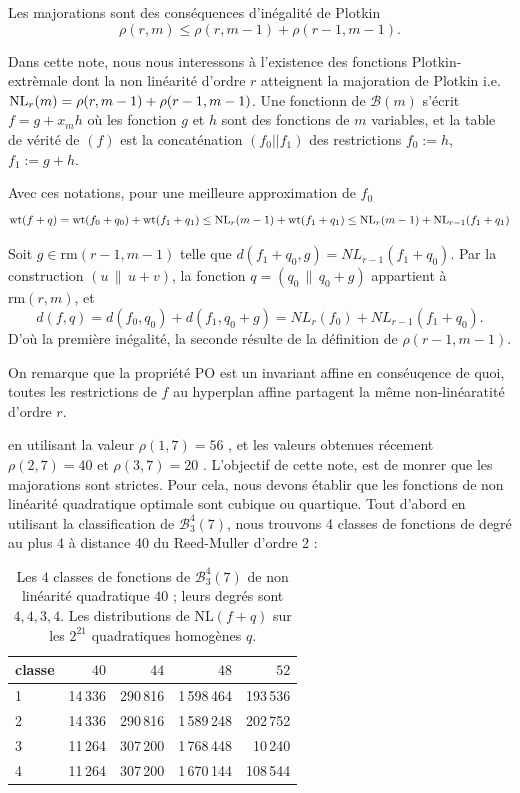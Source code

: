 \documentclass[11pt,a4paper]{article}
\newcommand{\wt}{\mathrm{wt}}
\newcommand{\Nl}{\mathrm{NL}}
\def\bst(#1,#2,#3){\mathcal{B}_{#1}^{#2}(#3)}
\def\NL(#1,#2){ {\rm NL}_{#1}(#2) }
\def\boole(#1){\mathcal{B}(#1)}
\theoremstyle{plain}
\theoremstyle{definition}
\theoremstyle{remark}
\begin{document}
Les majorations sont des conséquences d'inégalité de Plotkin
$$\rho(r,m) \leq \rho(r,m-1) + \rho(r-1,m-1).$$


Dans cette note, nous nous interessons à l'existence des
fonctions Plotkin-extrèmale dont la  non linéarité d'ordre $r$ 
atteignent la majoration de Plotkin i.e. $\NL(r,m) = \rho(r,m-1) + \rho(r-1,m-1)$.
Une fonctionn de $\boole(m)$  s'écrit $f=g+x_m h$ où les
fonction $g$ et $h$ sont des fonctions de $m$ variables, et
la table de vérité de $(f)$ est la concaténation $( f_0 || f_1 )$
des restrictions  $f_0:= h$, $f_1:=g+h$.

Avec ces notations, pour une meilleure approximation de $f_0$
$$
	\wt( f + q  ) = \wt( f_0 +q_0 ) + \wt( f_1 +q_1) \leq \NL(r,m-1) + \wt( f_1 +q_1) 
	\leq \NL(r,m-1) + \NL(r-1, f_1 + q_1 ) 
$$

Soit $g\in\mathrm{rm}(r-1,m-1)$ telle que $d(f_1+q_0,g)=NL_{r-1}(f_1+q_0)$.
Par la construction $(u\,\|\,u+v)$, la fonction $q=(q_0\,\|\,q_0+g)$ appartient à
$\mathrm{rm}(r,m)$, et
\[
d(f,q)=d(f_0,q_0)+d(f_1,q_0+g)=NL_r(f_0)+NL_{r-1}(f_1+q_0).
\]
D'où la première inégalité, la seconde résulte de la définition de $\rho(r-1,m-1)$.


On remarque que la propriété PO est un invariant affine en conséuqence de quoi,
toutes les restrictions de $f$ au hyperplan affine partagent la même 
non-linéaratité d'ordre $r$.






en utilisant  la valeur  $\rho(1,7)=56$ \cite{MYK,HOU},  et les valeurs obtenues récement $\rho(2,7)=40$ \cite{Wang19} 
et $\rho(3,7)=20$ \cite{GKLW}. L'objectif de cette note, est de monrer que les  majorations sont strictes. Pour cela,
nous devons établir que les fonctions de non linéarité quadratique optimale sont cubique ou quartique. Tout d'abord
en utilisant la classification de $\bst(3,4,7)$, nous trouvons 4 classes de fonctions de degré au plus 4
à distance 40 du Reed-Muller d'ordre 2 :

\begin{table}
\centering
\caption{\label{prop:4classes}
Les $4$ classes de fonctions de $\bst(3,4,7)$ de non linéarité quadratique 
 $40$ ; leurs degrés sont
$4,4,3,4$. Les distributions de $\Nl(f+q)$ sur les $2^{21}$ quadratiques homogènes $q$.
}
\begin{tabular}{lrrrr}
\toprule
classe & $40$ & $44$ & $48$ & $52$\\
\midrule
1 & 14\,336 & 290\,816 & 1\,598\,464 & 193\,536\\
2 & 14\,336 & 290\,816 & 1\,589\,248 & 202\,752\\
3 & 11\,264 & 307\,200 & 1\,768\,448 & 10\,240\\
4 & 11\,264 & 307\,200 & 1\,670\,144 & 108\,544\\
\bottomrule
\end{tabular}
\end{table}
\end{document}

